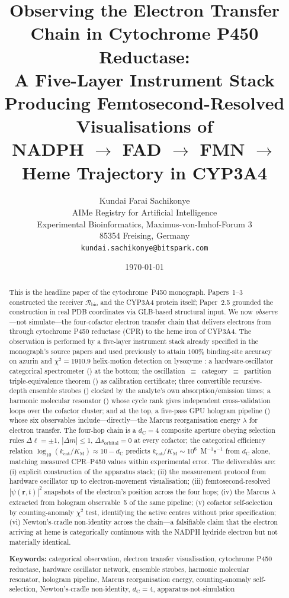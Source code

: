 \documentclass[11pt,twocolumn,a4paper]{article}
\title{\textbf{Observing the Electron Transfer Chain in Cytochrome P450 Reductase:\\
A Five-Layer Instrument Stack Producing Femtosecond-Resolved Visualisations of\\
{NADPH} $\to$ {FAD} $\to$ {FMN} $\to$ Heme Trajectory in CYP3A4}}
\author{
Kundai Farai Sachikonye\\[0.3em]
AIMe Registry for Artificial Intelligence\\
Experimental Bioinformatics, Maximus-von-Imhof-Forum 3\\
85354 Freising, Germany\\
\texttt{kundai.sachikonye@bitspark.com}
}
\date{\today}
\theoremstyle{definition}
\theoremstyle{remark}
\newcommand{\Recv}{\mathcal{R}}
\newcommand{\dC}{d_{\mathrm{C}}}
\newcommand{\kcat}{k_{\mathrm{cat}}}
\newcommand{\KM}{K_{\mathrm{M}}}
\begin{document}
\maketitle

\begin{abstract}
This is the headline paper of the cytochrome~P450 monograph. Papers~1--3
constructed the receiver $\Recv_{\mathrm{bio}}$ and the CYP3A4 protein
itself; Paper~2.5 grounded the construction in real PDB coordinates via
GLB-based structural input. We now \emph{observe}---not simulate---the
four-cofactor electron transfer chain that delivers electrons from
 through cytochrome P450 reductase (CPR) to the heme iron of
CYP3A4. The observation is performed by a five-layer instrument stack
already specified in the monograph's source papers and used previously to
attain $100\%$ binding-site accuracy on azurin and $\chi^2 = 1910.9$
helix-motion detection on lysozyme \citep{sachikonye2025_atomicspec}: a
hardware-oscillator categorical spectrometer
(\citep{sachikonye2025_hyperfine}) at the bottom; the
oscillation~$\equiv$~category~$\equiv$~partition triple-equivalence
theorem (\citep{sachikonye2025_specderiv}) as calibration certificate;
three convertible recursive-depth ensemble strobes
(\citep{sachikonye2025_strobes}) clocked by the analyte's own
absorption/emission times; a harmonic molecular resonator
(\citep{sachikonye2025_hmr}) whose cycle rank gives independent
cross-validation loops over the cofactor cluster; and at the top, a
five-pass GPU hologram pipeline (\citep{sachikonye2025_holograms}) whose
six observables include---directly---the Marcus reorganisation energy
$\lambda$ for electron transfer.
The four-hop chain is a $\dC = 4$ composite aperture obeying selection rules
$\Delta\ell = \pm 1$, $|\Delta m| \leq 1$, $\Delta s_{\mathrm{orbital}} = 0$
at every cofactor; the categorical efficiency relation
$\log_{10}(\kcat/\KM) \approx 10 - \dC$ predicts
$\kcat/\KM \sim 10^{6}$~M$^{-1}$s$^{-1}$ from $\dC$ alone, matching measured
CPR--P450 values within experimental error. The deliverables are: (i) explicit
construction of the apparatus stack; (ii) the measurement protocol from
hardware oscillator up to electron-movement visualisation; (iii)
femtosecond-resolved $|\psi(\mathbf{r}, t)|^2$ snapshots of the electron's
position across the four hops; (iv) the Marcus $\lambda$ extracted from
hologram observable~5 of the same pipeline; (v) cofactor self-selection by
counting-anomaly $\chi^2$ test, identifying the active centres without prior
specification; (vi) Newton's-cradle non-identity across the chain---a
falsifiable claim that the electron arriving at heme is categorically
continuous with the NADPH hydride electron but not materially identical.

\medskip
\noindent\textbf{Keywords:} categorical observation, electron transfer
visualisation, cytochrome P450 reductase, hardware oscillator network,
ensemble strobes, harmonic molecular resonator, hologram pipeline, Marcus
reorganisation energy, counting-anomaly self-selection, Newton's-cradle
non-identity, $\dC = 4$, apparatus-not-simulation
\end{abstract}
\end{document}
